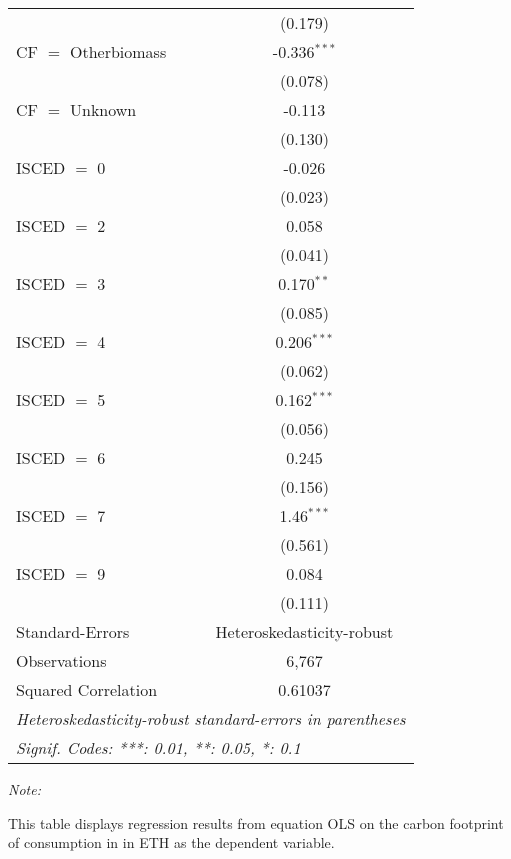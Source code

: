 \begin{table}[htbp!]
\begin{adjustbox}{width = 1\textwidth, max height = 0.95\textheight, center}
\begin{threeparttable}[b]
\begin{tabular}{lc}
                                & (0.179)\\   
            CF $=$ Otherbiomass & -0.336$^{***}$\\   
                                & (0.078)\\   
            CF $=$ Unknown      & -0.113\\   
                                & (0.130)\\   
            ISCED $=$ 0         & -0.026\\   
                                & (0.023)\\   
            ISCED $=$ 2         & 0.058\\   
                                & (0.041)\\   
            ISCED $=$ 3         & 0.170$^{**}$\\   
                                & (0.085)\\   
            ISCED $=$ 4         & 0.206$^{***}$\\   
                                & (0.062)\\   
            ISCED $=$ 5         & 0.162$^{***}$\\   
                                & (0.056)\\   
            ISCED $=$ 6         & 0.245\\   
                                & (0.156)\\   
            ISCED $=$ 7         & 1.46$^{***}$\\   
                                & (0.561)\\   
            ISCED $=$ 9         & 0.084\\   
                                & (0.111)\\   
            \midrule 
            Standard-Errors     & Heteroskedasticity-robust \\   
            Observations        & 6,767\\  
            Squared Correlation & 0.61037\\  
            \midrule \midrule
            \multicolumn{2}{l}{\emph{Heteroskedasticity-robust standard-errors in parentheses}}\\
            \multicolumn{2}{l}{\emph{Signif. Codes: ***: 0.01, **: 0.05, *: 0.1}}\\
         \end{tabular}
         
         \begin{tablenotes}\item \medskip \textit{Note:}
            \item This table displays regression results from equation OLS on the carbon footprint of consumption in  in ETH as the dependent variable.  
         \end{tablenotes}
      \end{threeparttable}
   \end{adjustbox}
\end{table}


